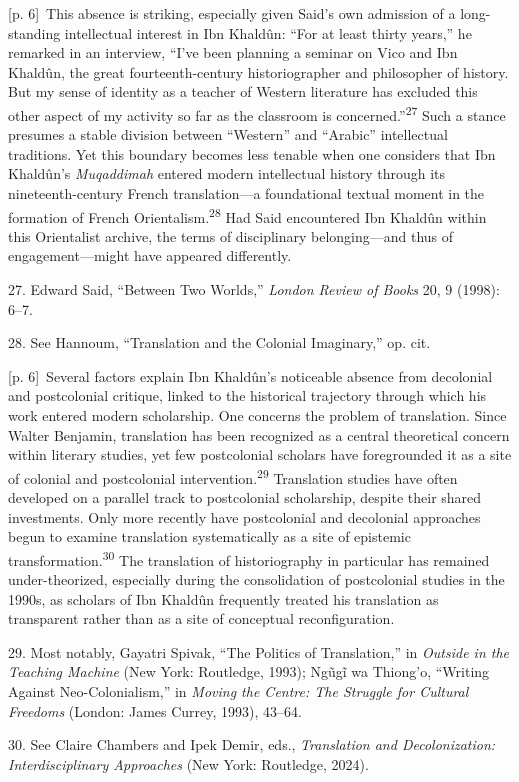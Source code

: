 \documentclass[10pt,a4paper]{article}
\begin{document}
{\scriptsize\color{gray} [p. 6]}\ This absence is striking, especially given Said’s own admission of a long-standing intellectual interest in Ibn Khaldûn: “For at least thirty years,” he remarked in an interview, “I’ve been planning a seminar on Vico and Ibn Khaldûn, the great fourteenth-century historiographer and philosopher of history. But my sense of identity as a teacher of Western literature has excluded this other aspect of my activity so far as the classroom is concerned.”\nobreak\textsuperscript{27} Such a stance presumes a stable division between “Western” and “Arabic” intellectual traditions. Yet this boundary becomes less tenable when one considers that Ibn Khaldûn’s \textit{Muqaddimah} entered modern intellectual history through its nineteenth-century French translation—a foundational textual moment in the formation of French Orientalism.\nobreak\textsuperscript{28} Had Said encountered Ibn Khaldûn within this Orientalist archive, the terms of disciplinary belonging—and thus of engagement—might have appeared differently.\par{\small 27. Edward Said, “Between Two Worlds,” \textit{London Review of Books} 20, 9 (1998): 6–7.\par}{\small 28. See Hannoum, “Translation and the Colonial Imaginary,” op. cit.\par}
{\scriptsize\color{gray} [p. 6]}\ Several factors explain Ibn Khaldûn’s noticeable absence from decolonial and postcolonial critique, linked to the historical trajectory through which his work entered modern scholarship. One concerns the problem of translation. Since Walter Benjamin, translation has been recognized as a central theoretical concern within literary studies, yet few postcolonial scholars have foregrounded it as a site of colonial and postcolonial intervention.\nobreak\textsuperscript{29} Translation studies have often developed on a parallel track to postcolonial scholarship, despite their shared investments. Only more recently have postcolonial and decolonial approaches begun to examine translation systematically as a site of epistemic transformation.\nobreak\textsuperscript{30} The translation of historiography in particular has remained under-theorized, especially during the consolidation of postcolonial studies in the 1990s, as scholars of Ibn Khaldûn frequently treated his translation as transparent rather than as a site of conceptual reconfiguration.\par{\small 29. Most notably, Gayatri Spivak, “The Politics of Translation,” in \textit{Outside in the Teaching Machine} (New York: Routledge, 1993); Ngũgĩ wa Thiong’o, “Writing Against Neo-Colonialism,” in \textit{Moving the Centre: The Struggle for Cultural Freedoms} (London: James Currey, 1993), 43–64.\par}{\small 30. See Claire Chambers and Ipek Demir, eds., \textit{Translation and Decolonization: Interdisciplinary Approaches} (New York: Routledge, 2024).\par}
\end{document}
